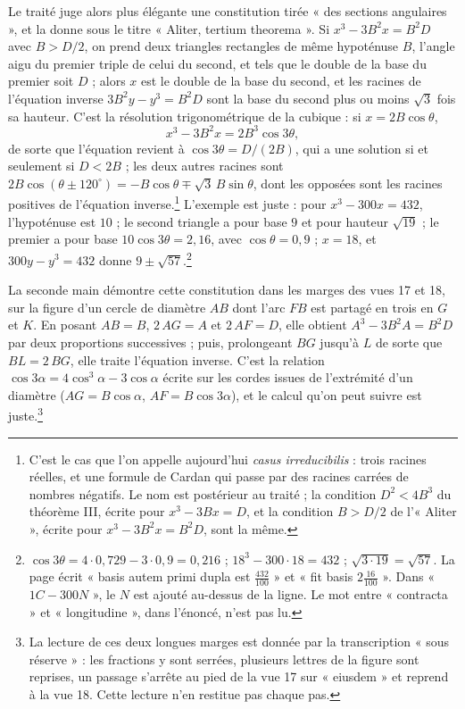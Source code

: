 \documentclass[11pt,a4paper]{article}
\begin{document}
Le traité juge alors plus élégante une constitution tirée « des sections
angulaires », et la donne sous le titre « Aliter, tertium theorema ». Si
$x^3 - 3B^2x = B^2D$ avec $B > D/2$, on prend deux triangles rectangles de même
hypoténuse $B$, l'angle aigu du premier triple de celui du second, et tels que
le double de la base du premier soit $D$ ; alors $x$ est le double de la base
du second, et les racines de l'équation inverse $3B^2y - y^3 = B^2D$ sont la base
du second plus ou moins $\sqrt{3}$ fois sa hauteur. C'est la résolution
trigonométrique de la cubique : si $x = 2B\cos\theta$,
\[ x^3 - 3B^2x = 2B^3\cos 3\theta , \]
de sorte que l'équation revient à $\cos 3\theta = D/(2B)$, qui a une solution
si et seulement si $D < 2B$ ; les deux autres racines sont
$2B\cos(\theta \pm 120^\circ) = -B\cos\theta \mp \sqrt{3}\,B\sin\theta$, dont les
opposées sont les racines positives de l'équation inverse.\footnote{C'est
le cas que l'on appelle aujourd'hui \emph{casus irreducibilis} : trois racines
réelles, et une formule de Cardan qui passe par des racines carrées de nombres
négatifs. Le nom est postérieur au traité ; la condition $D^2 < 4B^3$ du
théorème III, écrite pour $x^3 - 3Bx = D$, et la condition $B > D/2$ de
l'« Aliter », écrite pour $x^3 - 3B^2x = B^2D$, sont la même.} L'exemple est juste :
pour $x^3 - 300x = 432$, l'hypoténuse est $10$ ; le second triangle a pour base
$9$ et pour hauteur $\sqrt{19}$ ; le premier a pour base $10 \cos 3\theta
= 2{,}16$, avec $\cos\theta = 0{,}9$ ; $x = 18$, et $300y - y^3 = 432$ donne
$9 \pm \sqrt{57}$.\footnote{$\cos 3\theta = 4 \cdot 0{,}729 - 3 \cdot 0{,}9 =
0{,}216$ ; $18^3 - 300 \cdot 18 = 432$ ; $\sqrt{3 \cdot 19} = \sqrt{57}$. La page
écrit « basis autem primi dupla est $\frac{432}{100}$ » et « fit basis
$2\frac{16}{100}$ ». Dans « $1C - 300N$ », le $N$ est ajouté au-dessus de la
ligne. Le mot entre « contracta » et « longitudine », dans l'énoncé, n'est pas
lu.}

La seconde main démontre cette constitution dans les marges des vues 17 et 18,
sur la figure d'un cercle de diamètre $AB$ dont l'arc $FB$ est partagé en trois
en $G$ et $K$. En posant $AB = B$, $2\,AG = A$ et $2\,AF = D$, elle obtient
$A^3 - 3B^2A = B^2D$ par deux proportions successives ; puis, prolongeant $BG$
jusqu'à $L$ de sorte que $BL = 2\,BG$, elle traite l'équation inverse. C'est la
relation $\cos 3\alpha = 4\cos^3\alpha - 3\cos\alpha$ écrite sur les cordes issues
de l'extrémité d'un diamètre ($AG = B\cos\alpha$, $AF = B\cos 3\alpha$), et le
calcul qu'on peut suivre est juste.\footnote{La lecture de ces deux longues
marges est donnée par la transcription « sous réserve » : les fractions y sont
serrées, plusieurs lettres de la figure sont reprises, un passage s'arrête au
pied de la vue 17 sur « eiusdem » et reprend à la vue 18. Cette lecture n'en
restitue pas chaque pas.}
\end{document}
